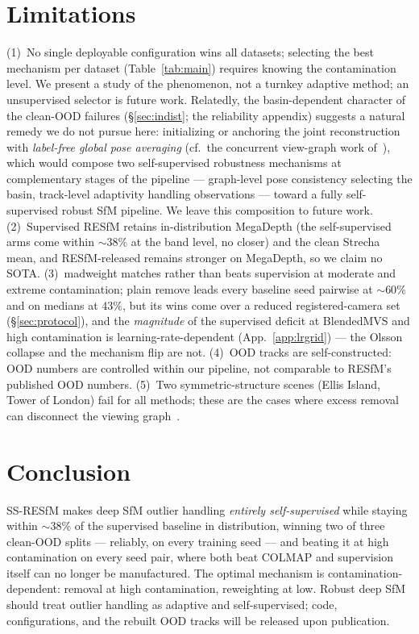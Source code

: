 \documentclass{article}
\newcommand{\mad}{madweight}
\begin{document}
\section{Limitations}
(1)~No single deployable configuration wins all datasets; selecting the best mechanism per
dataset (Table~\ref{tab:main}) requires knowing the contamination level. We present a study
of the phenomenon, not a turnkey adaptive method; an unsupervised selector is future work. Relatedly, the basin-dependent character of the clean-OOD failures
(\S\ref{sec:indist}; the reliability appendix) suggests a natural remedy we do not
pursue here: initializing or anchoring the joint reconstruction with \emph{label-free
global pose averaging} (cf.\ the concurrent view-graph work of~\citealt{vgpa}), which
would compose two self-supervised robustness mechanisms at complementary stages of the
pipeline --- graph-level pose consistency selecting the basin, track-level adaptivity
handling observations --- toward a fully self-supervised robust SfM pipeline. We leave
this composition to future work.
(2)~Supervised RESfM retains in-distribution MegaDepth (the self-supervised arms come
within $\sim\!38\%$ at the band level, no closer) and the clean Strecha mean, and RESfM-released
remains stronger on MegaDepth, so we claim no SOTA. (3)~\mad{} matches rather than beats supervision at moderate and extreme contamination;
plain remove leads every baseline seed pairwise at $\sim\!60\%$ and on medians at
$43\%$, but its wins come over a reduced registered-camera set (\S\ref{sec:protocol}),
and the \emph{magnitude} of the supervised deficit at BlendedMVS and high contamination
is learning-rate-dependent (App.~\ref{app:lrgrid}) --- the Olsson collapse and the
mechanism flip are not.
(4)~OOD tracks are self-constructed: OOD numbers are controlled within our pipeline, not
comparable to RESfM's published OOD numbers. (5)~Two symmetric-structure scenes (Ellis
Island, Tower of London) fail for all methods; these are the cases where excess removal
can disconnect the viewing graph~\citep{resfm}.

\section{Conclusion}
SS-RESfM makes deep SfM outlier handling \emph{entirely self-supervised} while staying
within $\sim\!38\%$ of the supervised baseline in distribution, winning two of three
clean-OOD splits --- reliably, on every training seed --- and beating it at high
contamination on every seed pair, where both beat COLMAP and supervision itself can no
longer be manufactured. The optimal mechanism is contamination-dependent: removal at
high contamination, reweighting at low. Robust deep SfM should treat outlier handling as
adaptive and self-supervised; code, configurations, and the rebuilt OOD tracks will be
released upon publication.
\end{document}
